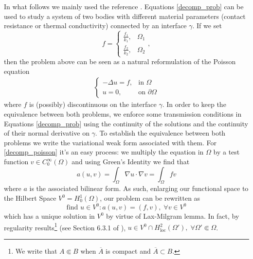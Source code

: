 In what follows we mainly used the reference \cite{quarteroni1999domain}. Equations \eqref{decomp_prob} can be used to study a system of two bodies with different material parameters (contact resistance or thermal conductivity) connected by an interface \(\gamma\). If we set
\[
f = \begin{cases}
    \frac{f_1}{k_1},& \Omega_1\\
    \frac{f_2}{k_2},& \Omega_2
\end{cases},   
\]
then the problem above can be seen as a natural reformulation of the Poisson equation
\begin{align}\label{decomp_poisson}
    \begin{cases}
        -\Delta u = f, & \text{in }\Omega \\
        u = 0, & \text{on } \partial\Omega
    \end{cases}
\end{align}
where \(f\) is (possibly) discontinuous on the interface \(\gamma\). In order to keep the equivalence between both problems, we enforce some transmission conditions in Equations \eqref{decomp_prob} using the continuity of the solutions and the continuity of their normal derivative on \(\gamma\). To establish the equivalence between both problems we write the variational weak form associated with them. For \eqref{decomp_poisson} it's an easy process: we multiply the equation in \(\Omega\) by a test function \(v \in C^\infty_0(\Omega)\) and using Green's Identity we find that
\[
a(u,v)=\int_\Omega \nabla u \cdot \nabla v = \int_\Omega f v
\]
where \(a\) is the associated bilinear form. As such, enlarging our functional space to the Hilbert Space \(V^0=H^1_0(\Omega)\), our problem can be rewritten as
\begin{equation}\label{weak_poisson}
    \text{find } u \in V^0: a(u,v) = (f, v), \; \forall v \in V^0   
\end{equation}
which has a unique solution in \(V^0\) by virtue of Lax-Milgram lemma. In fact, by regularity results\footnote{We write that \(A \Subset B\) when \(\overline{A}\) is compact and \(\overline{A} \subset B\).}  (see Section 6.3.1 of \cite{evans2022partial}), \(u \in V^0 \cap H^2_{\text{loc}}(\Omega'), \; \forall \Omega' \Subset \Omega\). 

